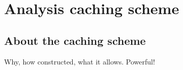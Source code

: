 \chapter{Analysis caching scheme}
\label{ch:caching_scheme_appendix}

\section{About the caching scheme}
Why, how constructed, what it allows. Powerful!